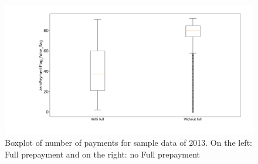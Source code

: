     \begin{figure}[H]
        \centering
        \includegraphics[width=\linewidth]{Latex/Report/Figures/payment_false_2013.png}
        \caption{Boxplot of number of payments for sample data of 2013. On the left: Full prepayment and on the right: no Full prepayment}
        \label{Model_boxplot_nopayment_false_2013}
    \end{figure}
    